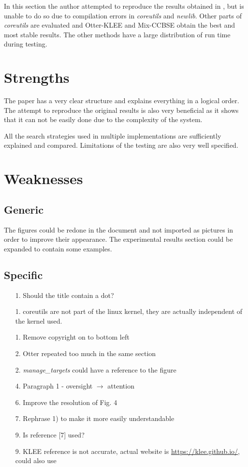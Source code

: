 \documentclass{article}
\begin{document}
In this section the author attempted to reproduce the results obtained in \cite{ma2011directed}, but is unable to do so due to compilation errors in \emph{coreutils} and \emph{newlib}. Other parts of \emph{coreutils} are evaluated and Otter-KLEE and Mix-CCBSE obtain the best and most stable results. The other methods have a large distribution of run time during testing.

\section{Strengths}

The paper has a very clear structure and explains everything in a logical order. The attempt to reproduce the original results is also very beneficial as it shows that it can not be easily done due to the complexity of the system.

All the search strategies used in multiple implementations are sufficiently explained and compared. Limitations of the testing are also very well specified.

\section{Weaknesses}

\subsection{Generic}

The figures could be redone in the document and not imported as pictures in order to improve their appearance. The experimental results section could be expanded to contain some examples.

\subsection{Specific}

\begin{enumerate}
	\item[1.] Should the title contain a dot?
	\item[1.] coreutils are not part of the linux kernel, they are actually independent of the kernel used.
	\item[1.] Remove copyright on to bottom left
	\item[2.] Otter repeated too much in the same section
	\item[2.] \emph{manage\_targets} could have a reference to the figure
	\item[4.] Paragraph 1 - oversight $\rightarrow$ attention
	\item[6.] Improve the resolution of Fig. 4
	\item[7.] Rephrase 1) to make it more easily understandable
	\item[9.] Is reference [7] used?
	\item[9.] KLEE reference is not accurate, actual website is \url{https://klee.github.io/}, could also use \cite{klee}
\end{enumerate}
\end{document}
